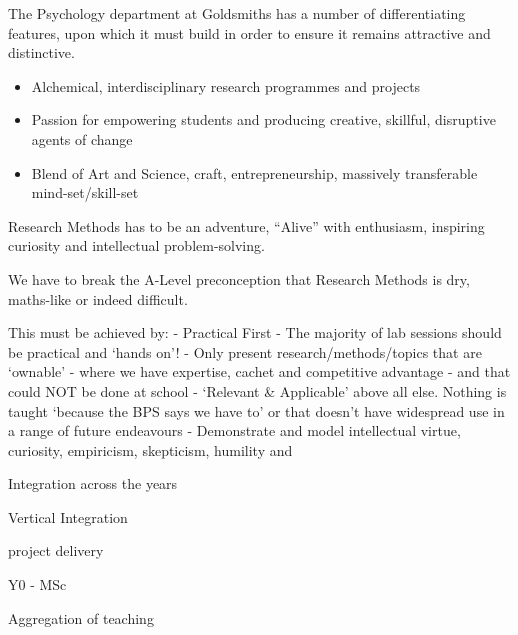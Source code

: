 \documentclass[
  11pt,
  letterpaper,
  oneside,
  open=any]{scrbook}
\providecommand{\tightlist}{%
  \setlength{\itemsep}{0pt}\setlength{\parskip}{0pt}}\usepackage{longtable,booktabs,array}
\begin{document}
\begin{tcolorbox}[enhanced jigsaw, rightrule=.15mm, opacitybacktitle=0.6, colbacktitle=quarto-callout-important-color!10!white, breakable, leftrule=.75mm, bottomtitle=1mm, toptitle=1mm, colback=white, titlerule=0mm, opacityback=0, title=\textcolor{quarto-callout-important-color}{\faExclamation}\hspace{0.5em}{Important}, arc=.35mm, bottomrule=.15mm, toprule=.15mm, left=2mm, coltitle=black]

The Psychology department at Goldsmiths has a number of differentiating
features, upon which it must build in order to ensure it remains
attractive and distinctive.

\begin{itemize}
\tightlist
\item
  Alchemical, interdisciplinary research programmes and projects
\item
  Passion for empowering students and producing creative, skillful,
  disruptive agents of change
\item
  Blend of Art and Science, craft, entrepreneurship, massively
  transferable mind-set/skill-set
\end{itemize}

Research Methods has to be an adventure, ``Alive'' with enthusiasm,
inspiring curiosity and intellectual problem-solving.

We have to break the A-Level preconception that Research Methods is dry,
maths-like or indeed difficult.

This must be achieved by: - Practical First - The majority of lab
sessions should be practical and `hands on'! - Only present
research/methods/topics that are `ownable' - where we have expertise,
cachet and competitive advantage - and that could NOT be done at school
- `Relevant \& Applicable' above all else. Nothing is taught `because
the BPS says we have to' or that doesn't have widespread use in a range
of future endeavours - Demonstrate and model intellectual virtue,
curiosity, empiricism, skepticism, humility and

\end{tcolorbox}

\begin{tcolorbox}[enhanced jigsaw, rightrule=.15mm, opacitybacktitle=0.6, colbacktitle=quarto-callout-important-color!10!white, breakable, leftrule=.75mm, bottomtitle=1mm, toptitle=1mm, colback=white, titlerule=0mm, opacityback=0, title=\textcolor{quarto-callout-important-color}{\faExclamation}\hspace{0.5em}{Departmental integration}, arc=.35mm, bottomrule=.15mm, toprule=.15mm, left=2mm, coltitle=black]

Integration across the years

Vertical Integration

project delivery

Y0 - MSc

Aggregation of teaching

\end{tcolorbox}
\end{document}
